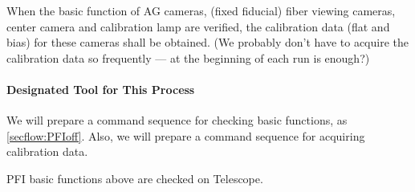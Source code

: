 When the basic function of AG cameras, (fixed fiducial) fiber viewing cameras, center camera and calibration lamp are verified, the calibration data (flat and bias) for these cameras shall be obtained.
(We probably don't have to acquire the calibration data so frequently --- at the beginning of each run is enough?)

\paragraph{Designated Tool for This Process}
We will prepare a command sequence for checking basic functions, as \ref{secflow:PFIoff}.
Also, we will prepare a command sequence for acquiring calibration data.

\begin{itembox}[l]{}
PFI basic functions above are checked on Telescope. 

\end{itembox}